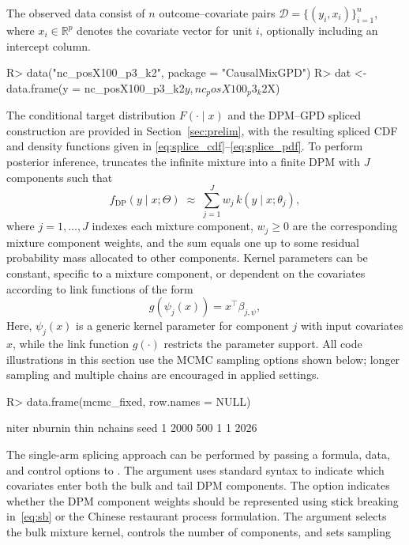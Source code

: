\documentclass[article]{jss}\usepackage[]{graphicx}\usepackage[]{xcolor}
\renewenvironment{Schunk}{\vspace{0pt}}{\vspace{-0.1\baselineskip}}
\begin{document}
The observed data consist of $n$ outcome--covariate pairs
$\mathcal{D}=\{(y_i,x_i)\}_{i=1}^n$, where $x_i\in\mathbb{R}^p$
denotes the covariate vector for unit $i$, optionally including an
intercept column.

\begin{Schunk}
\begin{Sinput}
R> data("nc_posX100_p3_k2", package = "CausalMixGPD")
R> dat <- data.frame(y = nc_posX100_p3_k2$y, nc_posX100_p3_k2$X)
\end{Sinput}
\end{Schunk}

The conditional target distribution $F(\cdot\mid x)$ and the DPM--GPD
spliced construction are provided in Section~\ref{sec:prelim},
with the resulting spliced CDF and density functions given in
\eqref{eq:splice_cdf}--\eqref{eq:splice_pdf}. To perform posterior
inference,  truncates the infinite mixture into
a finite DPM with $J$ components such that
\begin{equation*}
f_{\mathrm{DP}}(y\mid x;\Theta)\;\approx\;\sum_{j=1}^{J} w_j\,k(y\mid x;\theta_j),
\end{equation*}
where $j=1,\ldots,J$ indexes each mixture component, $w_j\ge 0$
are the corresponding mixture component weights, and the sum equals
one up to some residual probability mass allocated to other
components. Kernel parameters can be constant, specific to a
mixture component, or dependent on the covariates according to
link functions of the form
\begin{equation*}
  g\!\left(\psi_j(x)\right)=x^\top \beta_{j,\psi},
\end{equation*}
Here, $\psi_j(x)$ is a generic kernel parameter for component $j$
with input covariates $x$, while the link function $g(\cdot)$
restricts the parameter support. All code illustrations in this
section use the MCMC sampling options shown below;
longer sampling and multiple chains are encouraged in applied settings.

\begin{Schunk}
\begin{Sinput}
R> data.frame(mcmc_fixed, row.names = NULL)
\end{Sinput}
\begin{Soutput}
  niter nburnin thin nchains seed
1  2000     500    1       1 2026
\end{Soutput}
\end{Schunk}

The single-arm splicing approach can be performed by passing a
formula, data, and control options to . The
 argument uses standard  syntax to indicate
which covariates enter both the bulk and tail DPM components.
The  option indicates whether the DPM component
weights should be represented using stick breaking in~\eqref{eq:sb}
or the Chinese restaurant process formulation. The 
argument selects the bulk mixture kernel, 
controls the number of components, and  sets sampling
\end{document}
